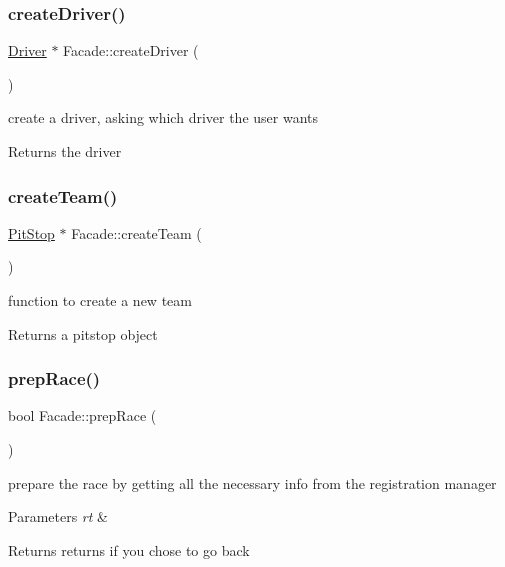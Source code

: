 \subsubsection{\texorpdfstring{create\+Driver()}{createDriver()}}
{\footnotesize\ttfamily \mbox{\hyperlink{class_driver}{Driver}} $\ast$ Facade\+::create\+Driver (\begin{DoxyParamCaption}{ }\end{DoxyParamCaption})}

create a driver, asking which driver the user wants \begin{DoxyReturn}{Returns}
the driver 
\end{DoxyReturn}
\mbox{\label{class_facade_ad77479711f459ddab775288aa0553d50}} 
\subsubsection{\texorpdfstring{create\+Team()}{createTeam()}}
{\footnotesize\ttfamily \mbox{\hyperlink{class_pit_stop}{Pit\+Stop}} $\ast$ Facade\+::create\+Team (\begin{DoxyParamCaption}{ }\end{DoxyParamCaption})}

function to create a new team \begin{DoxyReturn}{Returns}
a pitstop object 
\end{DoxyReturn}
\mbox{\label{class_facade_a96625dee1b4fab0b7921701cbe164e9e}} 
\subsubsection{\texorpdfstring{prep\+Race()}{prepRace()}}
{\footnotesize\ttfamily bool Facade\+::prep\+Race (\begin{DoxyParamCaption}{ }\end{DoxyParamCaption})}

prepare the race by getting all the necessary info from the registration manager 
\begin{DoxyParams}{Parameters}
{\em rt} & \\
\hline
\end{DoxyParams}
\begin{DoxyReturn}{Returns}
returns if you chose to go back 
\end{DoxyReturn}
\mbox{\label{class_facade_a5afbadb755edf573f9c1a0a05c0f264b}} 
